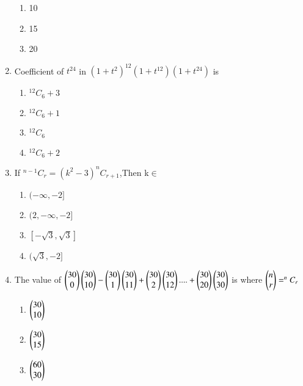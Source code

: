 \begin{enumerate}[label=\arabic*.,ref=\thesubsection.\theenumi]
\begin{enumerate}
\item 10

\item 15

\item 20
\end{enumerate}
\item Coefficient of $t^{24}$ in $(1+t^2)^{12}(1+t^{12})(1+t^{24})$ is
\begin{enumerate}
\item $^{12}C_6+3$

\item $^{12}C_6+1$

\item $^{12}C_6$

\item $^{12}C_6+2$
\end{enumerate}
\item If $^{n-1}C_r=(k^2-3) ^{n}C_{r+1}$,Then k$\in$
\begin{enumerate}
\item $(-\infty,-2]$
\item $(2,-\infty,-2]$
\item $[-\sqrt{3},\sqrt{3}]$
\item $(\sqrt{3},-2]$
\end{enumerate}
\item The value of $\begin{pmatrix}30\\0\end{pmatrix}\begin{pmatrix}30\\10\end{pmatrix}-\begin{pmatrix}30\\1\end{pmatrix}\begin{pmatrix}30\\11\end{pmatrix}+\begin{pmatrix}30\\2\end{pmatrix}\begin{pmatrix}30\\12\end{pmatrix}....+\begin{pmatrix}30\\20\end{pmatrix}\begin{pmatrix}30\\30\end{pmatrix}$ is where $\begin{pmatrix}n\\r\end{pmatrix}=^nC_r$
\begin{enumerate}
\item $\begin{pmatrix}30\\10\end{pmatrix}$

\item $\begin{pmatrix}30\\15\end{pmatrix}$

\item $\begin{pmatrix}60\\30\end{pmatrix}$


\end{enumerate}
\end{enumerate}
